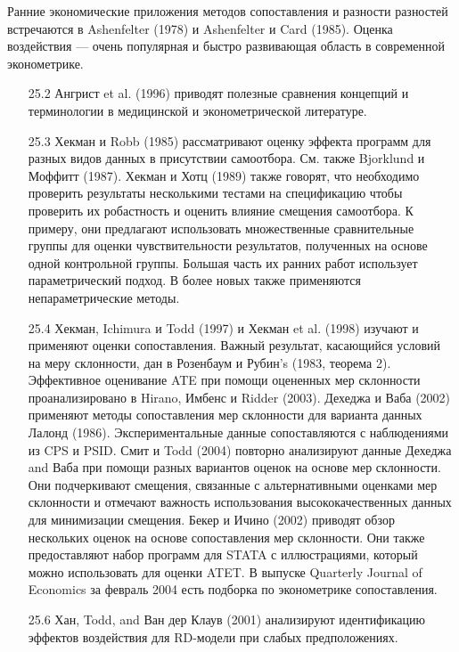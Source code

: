 Ранние экономические приложения методов сопоставления и разности разностей встречаются в Ashenfelter (1978) и Ashenfelter и Card (1985). Оценка воздействия --- очень популярная и быстро развивающая область в современной эконометрике. 
\begin{enumerate}
\item[25.2] Ангрист et al. (1996) приводят полезные сравнения концепций и терминологии в медицинской и эконометрической литературе.  
\item[25.3] Хекман и Robb (1985) рассматривают оценку эффекта программ для разных видов данных в присутствии самоотбора. См. также  Bjorklund и Моффитт (1987). Хекман и Хотц (1989) также говорят, что необходимо проверить результаты несколькими тестами на спецификацию чтобы проверить их робастность и оценить влияние смещения самоотбора. К примеру, они предлагают использовать множественные сравнительные группы для оценки чувствительности результатов, полученных на основе одной контрольной группы. Большая часть их ранних работ использует параметрический подход. В более новых также применяются непараметрические методы. 
\item[25.4] Хекман, Ichimura и Todd (1997) и Хекман et al. (1998) изучают и применяют оценки сопоставления. Важный результат, касающийся условий на меру склонности, дан в Розенбаум и Рубин’s (1983, теорема 2). Эффективное оценивание ATE при помощи оцененных мер склонности проанализировано в Hirano, Имбенс и Ridder (2003). Дехеджа и Ваба (2002) применяют методы сопоставления мер склонности для варианта данных Лалонд (1986). Экспериментальные данные сопоставляются с наблюдениями из CPS и PSID. Смит и Todd (2004) повторно анализируют данные Дехеджа and Ваба при помощи разных вариантов оценок на основе мер склонности. Они подчеркивают смещения, связанные с альтернативными оценками мер склонности и отмечают важность использования высококачественных данных для минимизации смещения. Бекер и Ичино (2002) приводят обзор нескольких оценок на основе сопоставления мер склонности. Они также предоставляют набор программ для STATA с иллюстрациями, который можно использовать для оценки ATET. В выпуске Quarterly Journal of Economics за февраль 2004 есть подборка по эконометрике сопоставления. 
\item[25.6] Хан, Todd, and Ван дер Клаув (2001) анализируют идентификацию эффектов воздействия для RD-модели при слабых предположениях.  

\end{enumerate}
